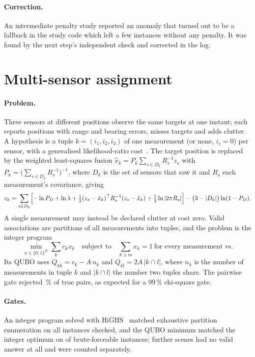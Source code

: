 \documentclass[11pt,a4paper]{article}
\begin{document}
\paragraph{Correction.} An intermediate penalty study reported an anomaly that turned out to be a fallback in the study code which left a
few instances without any penalty. It was found by the next step's independent check and corrected in the log.

\section{Multi-sensor assignment}\label{sec:p2}

\paragraph{Problem.} Three sensors at different positions observe the same targets at one instant; each reports positions with range and
bearing errors, misses targets and adds clutter. A hypothesis is a tuple $k=(i_1,i_2,i_3)$ of one measurement (or none, $i_s=0$) per sensor, with a
generalised likelihood-ratio cost~\cite{deb1997sd}. The target position is replaced by the weighted least-squares fusion
$\hat x_k = P_k\sum_{s\in D_k} R_s^{-1} z_s$ with $P_k = \bigl(\sum_{s\in D_k} R_s^{-1}\bigr)^{-1}$, where $D_k$ is the set of sensors
that saw it and $R_s$ each measurement's covariance, giving
\begin{equation}
c_k = \sum_{s\in D_k}\Bigl[-\ln P_D + \ln\lambda + \tfrac12 (z_s-\hat x_k)^\top R_s^{-1}(z_s-\hat x_k) + \tfrac12\ln|2\pi R_s|\Bigr]
      - \bigl(3-|D_k|\bigr)\ln(1-P_D).
\end{equation}
A single measurement may instead be declared clutter at cost zero. Valid associations are partitions of all measurements into tuples,
and the problem is the integer program
\begin{equation}
\min_{x\in\{0,1\}^K} \sum_k c_k x_k \quad\text{subject to}\quad \sum_{k\ni m} x_k = 1 \ \text{for every measurement } m.
\end{equation}
Its QUBO uses $Q_{kk} = c_k - A\,n_k$ and $Q_{kl} = 2A\,|k\cap l|$, where $n_k$ is the number of measurements in tuple $k$ and $|k\cap l|$
the number two tuples share. The pairwise gate rejected
\PtwoGateRejectedPct\,\% of \PtwoGateTruePairs{} true pairs, as expected for a 99\,\% chi-square gate.

\paragraph{Gates.} An integer program solved with HiGHS~\cite{huangfu2018highs,virtanen2020scipy} matched exhaustive partition
enumeration on all \PtwoILPGate{} instances checked, and the QUBO minimum matched the integer optimum on \PtwoQUBOGatePassed{} of
\PtwoQUBOGate{} brute-forceable instances; \PtwoQUBOInfeasible{} further scenes had no valid answer at all and were counted separately.
\end{document}
